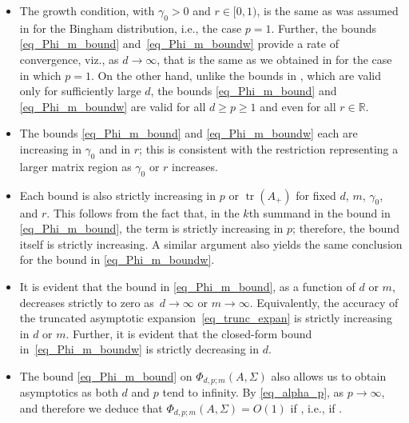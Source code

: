 \documentclass[pdftex]{sigma}
\numberwithin{equation}{section}
\def\R {\mathbb{R}}
\def\tr {\mathop{\mathrm{tr}}}
\begin{document}
\begin{Remark}\label{rem_bound_Bingham}\quad
\begin{itemize}\itemsep=0pt
\item[(i)] The growth condition,  with $\gamma_0 > 0$ and $r \in [0,1)$, is the same as was assumed in \cite{BagyanRichards} for the Bingham distribution, i.e., the case $p=1$. Further, the bounds \eqref{eq_Phi_m_bound} and~\eqref{eq_Phi_m_boundw} provide a rate of convergence, viz.,  as $d \to \infty$, that is the same as we obtained in \cite{BagyanRichards} for the case in which $p = 1$. On the other hand, unlike the bounds in \cite{BagyanRichards}, which are valid only for sufficiently large $d$, the bounds \eqref{eq_Phi_m_bound} and \eqref{eq_Phi_m_boundw} are valid for all $d \ge p \ge 1$ and even for all $r \in \R$.

\item[(ii)] The bounds \eqref{eq_Phi_m_bound} and \eqref{eq_Phi_m_boundw} each are increasing in $\gamma_0$ and in $r$; this is consistent with the restriction  representing a larger matrix region as $\gamma_0$ or $r$ increases.

\item[(iii)] Each bound is also strictly increasing in $p$ or $\tr(A_+)$ for fixed $d$, $m$, $\gamma_0$, and $r$. This follows from the fact that, in the $k$th summand in the bound in \eqref{eq_Phi_m_bound}, the term  is strictly increasing in $p$; therefore, the bound itself is strictly increasing. A similar argument also yields the same conclusion for the bound in \eqref{eq_Phi_m_boundw}.

\item[(iv)] It is evident that the bound in \eqref{eq_Phi_m_bound}, as a function of $d$ or $m$, decreases strictly to zero as~${d \to \infty}$ or $m \to \infty$. Equivalently, the accuracy of the truncated asymptotic expansion~\eqref{eq_trunc_expan} is strictly increasing in $d$ or $m$.
Further, it is evident that the closed-form bound in~\eqref{eq_Phi_m_boundw} is strictly decreasing in $d$.

\item[(v)] The bound \eqref{eq_Phi_m_bound} on $\Phi_{d,p;m}(A,\Sigma)$ also allows us to obtain asymptotics as both $d$ and $p$ tend to infinity. By \eqref{eq_alpha_p},  as $p \to \infty$, and therefore we deduce that $\Phi_{d,p;m}(A,\Sigma) = O(1)$ if \smash{$(\tr A_+)^2 p d^{-(1-r)} = O(1)$}, i.e., if \smash{$(\tr A_+)^2 p = O\bigl(d^{1-r}\bigr)$}.
 \end{itemize}
\end{Remark}
\end{document}
